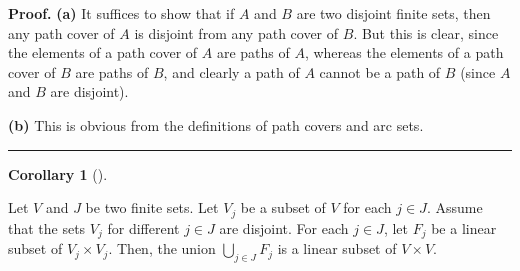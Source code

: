 \documentclass[numbers=enddot,12pt,final,onecolumn,notitlepage]{scrartcl}%
\numberwithin{exer}{section}
\theoremstyle{definition}
\newtheorem{coro}[theo]{Corollary}
\newenvironment{corollary}[1][]
{\begin{coro}[#1]\begin{leftbar}}
{\end{leftbar}\end{coro}}
\newenvironment{proof}[1][Proof]{\noindent\textbf{#1.} }{\ \rule{0.5em}{0.5em}}
\let\cupnonlimits\bigcup
\renewcommand{\bigcup}{\cupnonlimits\limits}
\newenvironment{verlong}{}{}
\begin{document}
\begin{verlong}


\begin{proof}
\textbf{(a)} It suffices to show that if $A$ and $B$ are two disjoint finite
sets, then any path cover of $A$ is disjoint from any path cover of $B$. But
this is clear, since the elements of a path cover of $A$ are paths of $A$,
whereas the elements of a path cover of $B$ are paths of $B$, and clearly a
path of $A$ cannot be a path of $B$ (since $A$ and $B$ are disjoint).

\textbf{(b)} This is obvious from the definitions of path covers and arc sets.
\end{proof}
\end{verlong}

\begin{corollary}
\label{cor.linear-djun}Let $V$ and $J$ be two finite sets. Let $V_{j}$ be a
subset of $V$ for each $j\in J$. Assume that the sets $V_{j}$ for different
$j\in J$ are disjoint. For each $j\in J$, let $F_{j}$ be a linear subset of
$V_{j}\times V_{j}$. Then, the union $\bigcup_{j\in J}F_{j}$ is a linear
subset of $V\times V$.
\end{corollary}
\end{document}
